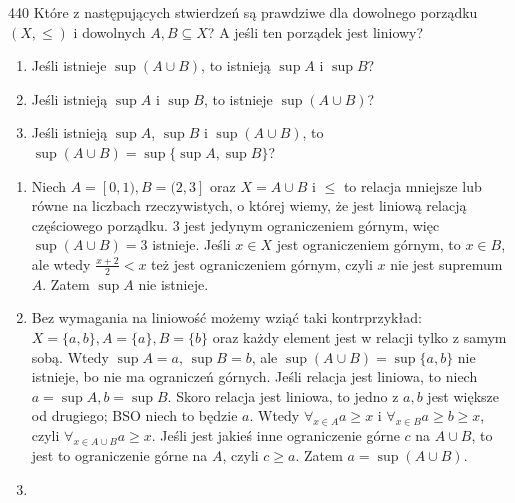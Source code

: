 \documentclass{../note}
\begin{document}
\begin{zadanie}{440}
Które z następujących stwierdzeń są prawdziwe dla dowolnego porządku $(X, \le)$ i dowolnych $A, B \subseteq X$? A jeśli ten porządek jest liniowy?
\begin{enumerate}[label=(\alph*)]
    \item Jeśli istnieje $\sup(A \cup B)$, to istnieją $\sup A$ i $\sup B$?
    \item Jeśli istnieją $\sup A$ i $\sup B$, to istnieje $\sup(A \cup B)$?
    \item Jeśli istnieją $\sup A$, $\sup B$ i $\sup(A \cup B)$, to $\sup(A \cup B) = \sup\{\sup A, \sup B\}$?
\end{enumerate}
\end{zadanie}
\begin{rozwiazanie}
\begin{enumerate}[label=(\alph*)]
    \item Niech $A = [0, 1), B = (2, 3]$ oraz $X = A \cup B$ i $\leq$ to relacja mniejsze lub równe na liczbach rzeczywistych, o której wiemy, że jest liniową relacją częściowego porządku. 3 jest jedynym ograniczeniem górnym, więc $\sup(A\cup B) = 3$ istnieje. Jeśli $x \in X$ jest ograniczeniem górnym, to $x \in B$, ale wtedy $\frac{x+2}{2} < x$ też jest ograniczeniem górnym, czyli $x$ nie jest supremum $A$. Zatem $\sup A$ nie istnieje.
    \item Bez wymagania na liniowość możemy wziąć taki kontrprzykład: $X = \{a, b\}, A = \{a\}, B = \{b\}$ oraz każdy element jest w relacji tylko z samym sobą. Wtedy $\sup A = a$, $\sup B = b$, ale $\sup(A \cup B) = \sup\{a, b\}$ nie istnieje, bo nie ma ograniczeń górnych. Jeśli relacja jest liniowa, to niech $a = \sup A, b = \sup B$. Skoro relacja jest liniowa, to jedno z $a, b$ jest większe od drugiego; BSO niech to będzie $a$. Wtedy $\forall_{x\in A} a \geq x$ i $\forall_{x\in B} a \geq b \geq x$, czyli $\forall_{x\in A\cup B} a \geq x$. Jeśli jest jakieś inne ograniczenie górne $c$ na $A \cup B$, to jest to ograniczenie górne na $A$, czyli $c \geq a$. Zatem $a = \sup(A\cup B)$.
    \item 
\end{enumerate}
\end{rozwiazanie}
\end{document}
